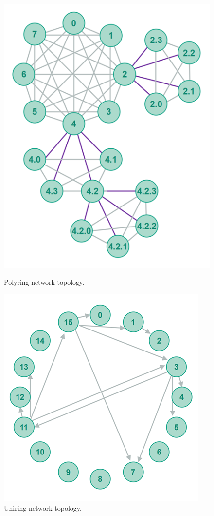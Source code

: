 \begin{figure}
	\includegraphics[width=\textwidth/2]{pictures/polyring.png}
	\caption{Polyring network topology.\cite{Jenkov_undated-kl}}
	\label{Polyring}

	\includegraphics[width=\textwidth/2]{pictures/uniring.png}
	\caption{Uniring network topology.\cite{Jenkov_undated-kl}}
	\label{Uniring}
\end{figure}

